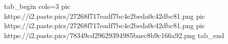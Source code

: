  
 
 
 
 

\ifcmt
  tab_begin cols=3
     pic https://i2.paste.pics/27268f717eadf7bc4e2beda0c42dbc81.png
     pic https://i2.paste.pics/27268f717eadf7bc4e2beda0c42dbc81.png
		 pic https://i2.paste.pics/78349cd29629394985baec8b9c166a92.png
  tab_end
\fi
